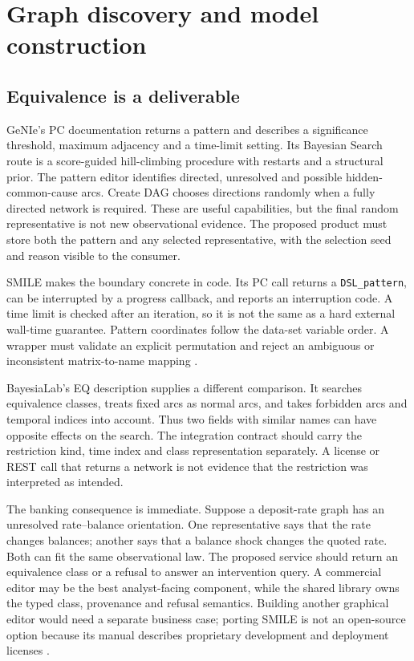 \section{Graph discovery and model construction}
\label{exec17:s8-discovery}

\subsection{Equivalence is a deliverable}

GeNIe's PC documentation returns a pattern and describes a significance
threshold, maximum adjacency and a time-limit setting. Its Bayesian Search
route is a score-guided hill-climbing procedure with restarts and a structural
prior. The pattern editor identifies directed, unresolved and possible
hidden-common-cause arcs. Create DAG chooses directions randomly when a fully
directed network is required. These are useful capabilities, but the final
random representative is not new observational evidence. The proposed product
must store both the pattern and any selected representative, with the selection
seed and reason visible to the consumer.

SMILE makes the boundary concrete in code. Its PC call returns a
\texttt{DSL\_pattern}, can be interrupted by a progress callback, and reports
an interruption code. A time limit is checked after an iteration, so it is not
the same as a hard external wall-time guarantee. Pattern coordinates follow
the data-set variable order. A wrapper must validate an explicit permutation
and reject an ambiguous or inconsistent matrix-to-name mapping
\citep{exec13_smile_pc,exec13_smile_pattern}.

BayesiaLab's EQ description supplies a different comparison. It searches
equivalence classes, treats fixed arcs as normal arcs, and takes forbidden arcs
and temporal indices into account. Thus two fields with similar names can have
opposite effects on the search. The integration contract should carry the
restriction kind, time index and class representation separately. A license or
REST call that returns a network is not evidence that the restriction was
interpreted as intended.

The banking consequence is immediate. Suppose a deposit-rate graph has an
unresolved rate--balance orientation. One representative says that the rate
changes balances; another says that a balance shock changes the quoted rate.
Both can fit the same observational law. The proposed service should return an
equivalence class or a refusal to answer an intervention query. A commercial
editor may be the best analyst-facing component, while the shared library owns
the typed class, provenance and refusal semantics. Building another graphical
editor would need a separate business case; porting SMILE is not an
open-source option because its manual describes proprietary development and
deployment licenses
\citep{exec13_smile_intro,exec13_smile_license}.

